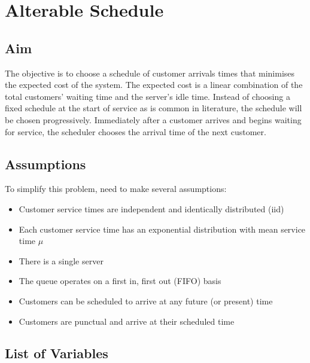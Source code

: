 \chapter{Alterable Schedule}

\section{Aim}

The objective is to choose a schedule of customer arrivals times that minimises the expected cost of the system. The expected cost is a linear combination of the total customers' waiting time and the server's idle time. Instead of choosing a fixed schedule at the start of service as is common in literature, the schedule will be chosen progressively. Immediately after a customer arrives and begins waiting for service, the scheduler chooses the arrival time of the next customer.

\section{Assumptions}

To simplify this problem, need to make several assumptions:

\begin{itemize}
	\item Customer service times are independent and identically distributed (iid)
	\item Each customer service time has an exponential distribution with mean service time $\mu$
	\item There is a single server
	\item The queue operates on a first in, first out (FIFO) basis
	\item Customers can be scheduled to arrive at any future (or present) time
	\item Customers are punctual and arrive at their scheduled time
\end{itemize}

\section{List of Variables}

